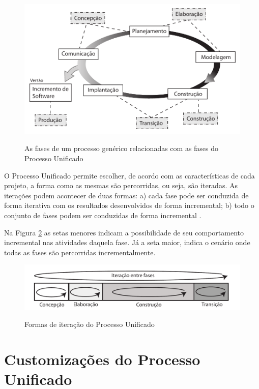 \begin{figure}[!h]
\centering
\caption{As fases de um processo genérico relacionadas com as fases do Processo Unificado}
\includegraphics{pdfs/img-processo-unificado.pdf}
\label{fig:processo_unificado} 
\end{figure}

O Processo Unificado permite escolher, de acordo com as características de cada projeto, a forma como as mesmas são percorridas, ou seja, são iteradas. As iterações podem acontecer de duas formas: a) cada fase pode ser conduzida de forma iterativa com os resultados desenvolvidos de forma incremental; b) todo o conjunto de fases podem ser conduzidas de forma incremental \cite{sommerville10}.

Na Figura \ref{fig:processo_unificado_iteracoes} as setas menores indicam a possibilidade de seu comportamento incremental nas atividades daquela fase. Já a seta maior, indica o cenário onde todas as fases são percorridas incrementalmente.

\begin{figure}[!h]
\centering
\caption{Formas de iteração do Processo Unificado}
\includegraphics[width=1.0\textwidth]{pdfs/img-processo-unificado-fases.pdf}
\label{fig:processo_unificado_iteracoes} 
\end{figure}

\section{Customizações do Processo Unificado}

